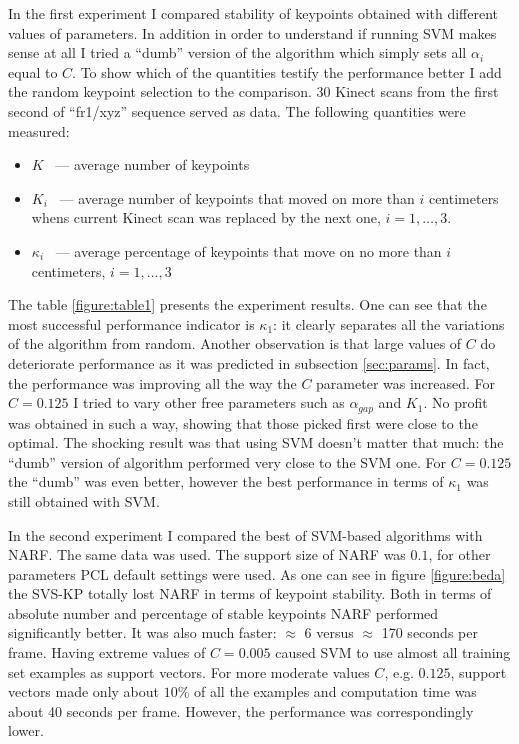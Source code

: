 In the first experiment I compared stability of keypoints obtained with different values of parameters. In addition in order to understand if running SVM makes sense at all I tried a ``dumb'' version of the algorithm which simply sets all $\alpha_i$ equal to $C$. To show which of the quantities testify the performance better I add the random keypoint selection to the comparison. 30 Kinect scans from the first second of ``fr1/xyz'' sequence served as data. The following quantities were measured:
\begin{itemize}
\item
$K$ ~--- average number of keypoints
\item
$K_i$ ~--- average number of keypoints that moved on more than $i$ centimeters whens current Kinect scan was replaced by the next one, $i=1,\ldots,3$.
\item
$\kappa_i$ ~--- average percentage of keypoints that move on no more than $i$ centimeters, $i=1,\ldots,3$
\end{itemize}

The table \ref{figure:table1} presents the experiment results. One can see that the most successful performance indicator is $\kappa_1$: it clearly separates all the variations of the algorithm from random. Another observation is that large values of $C$ do deteriorate performance as it was predicted in subsection \ref{sec:params}. In fact, the performance was improving all the way the $C$ parameter was increased. For $C=0.125$ I tried to vary other free parameters such as $\alpha_{gap}$ and $K_1$. No profit was obtained in such a way, showing that those picked first were close to the optimal. The shocking result was that  using SVM doesn't matter that much: the ``dumb'' version of algorithm performed very close to the SVM one. For $C=0.125$ the ``dumb'' was even better, however the best performance in terms of $\kappa_{1}$ was still obtained with SVM.

In the second experiment I compared the best of SVM-based algorithms with NARF. The same data was used. The support size of NARF was $0.1$, for other parameters PCL default settings were used. As one can see in figure \ref{figure:beda} the SVS-KP totally lost NARF in terms of keypoint stability. Both in terms of absolute number and percentage of stable keypoints NARF performed significantly better. It was also much faster: $\approx$ 6 versus $\approx$ 170 seconds per frame. Having extreme values of $C=0.005$ caused SVM to use almost all training set examples as support vectors. For more moderate values $C$, e.g. $0.125$, support vectors made only about $10\%$ of all the examples and computation time was about 40 seconds per frame. However, the performance was correspondingly lower. 

